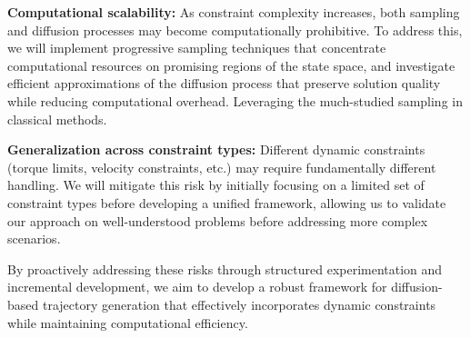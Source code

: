    \item \textbf{Computational scalability:} As constraint complexity increases, both sampling and diffusion processes may become computationally prohibitive. To address this, we will implement progressive sampling techniques that concentrate computational resources on promising regions of the state space, and investigate efficient approximations of the diffusion process that preserve solution quality while reducing computational overhead. Leveraging the much-studied sampling in classical methods.

   \item \textbf{Generalization across constraint types:} Different dynamic constraints (torque limits, velocity constraints, etc.) may require fundamentally different handling. We will mitigate this risk by initially focusing on a limited set of constraint types before developing a unified framework, allowing us to validate our approach on well-understood problems before addressing more complex scenarios.


By proactively addressing these risks through structured experimentation and incremental development, we aim to develop a robust framework for diffusion-based trajectory generation that effectively incorporates dynamic constraints while maintaining computational efficiency.










